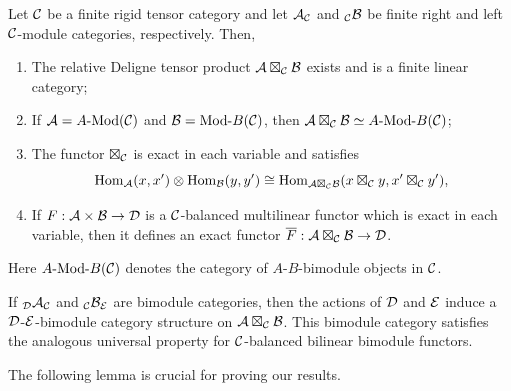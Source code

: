 \documentclass{amsart}
\begin{document}
\begin{theorem} \label{thm:DelignePrdtOverATCExists}
	Let $\mathcal C$ be a finite rigid tensor category and let $\mathcal A_{\mathcal C}$ and ${}_{\mathcal C}\mathcal B$ be finite right and left $\mathcal C$-module categories, respectively. Then,
	\begin{enumerate}
		\item The relative Deligne tensor product $\mathcal A \boxtimes_{\mathcal C} \mathcal B$ exists and is a finite linear category;
		\item If $\cA = \Mod{A}{}(\cC)$ and $\cB = \Mod{}{B}(\cC)$, then $\cA \boxtimes_{\cC} \cB \simeq \Mod{A }{B}(\cC)$;

		\item The functor $\boxtimes_{\mathcal C}$ is exact in each variable and satisfies 
		\begin{equation*}
			\operatorname{Hom}_{\mathcal A}(x,x') \otimes \operatorname{Hom}_{\mathcal B}(y, y') \cong \operatorname{Hom}_{\mathcal A \boxtimes_{\mathcal C} \mathcal B} (x \boxtimes_{\mathcal C} y, x' \boxtimes_{\mathcal C} y'),
		\end{equation*}
		\item If $F: \mathcal A \times \mathcal B \to \mathcal D$ is a $\mathcal C$-balanced multilinear functor which is exact in each variable, then it defines an exact functor $\overline{F}: \mathcal A \boxtimes_{\mathcal C} \mathcal B \to \mathcal D$. 
	\end{enumerate} 
\end{theorem}
\nid Here $\Mod{A}{B}(\cC)$ denotes the category of $A$-$B$-bimodule objects in $\mathcal C$.


\begin{remark}
	If ${}_{\mathcal D}\mathcal A_{\mathcal C}$ and ${}_{\mathcal C}\mathcal B_{\mathcal E}$ are bimodule categories, then the actions of $\mathcal D$ and $\mathcal E$ induce a $\mathcal D$-$\mathcal E$-bimodule category structure on $\mathcal A \boxtimes_{\mathcal C} \mathcal B$. This bimodule category satisfies the analogous universal property for $\mathcal C$-balanced bilinear bimodule functors. 
\end{remark}

The following lemma is crucial for proving our results.
\end{document}
